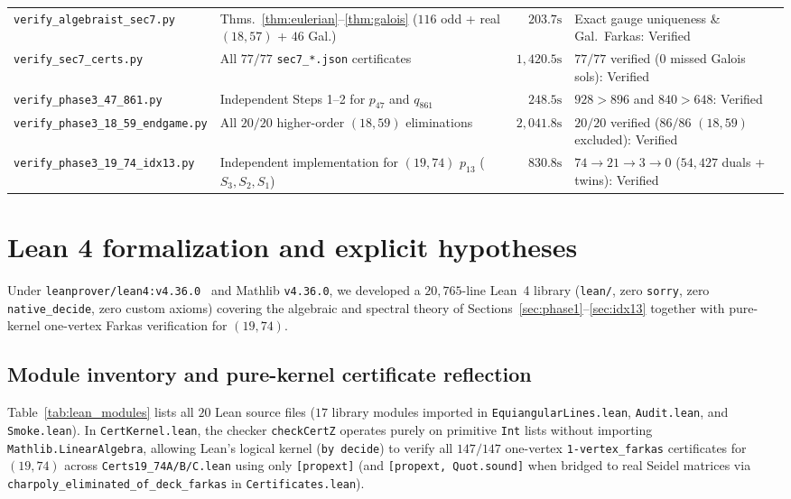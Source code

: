 \documentclass[11pt,reqno]{amsart}
\theoremstyle{definition}
\theoremstyle{remark}
\numberwithin{equation}{section}
\numberwithin{table}{section}
\begin{document}
\begin{table}[htbp]
{\begin{tabular}{@{}llrl@{}}
\nolinkurl{verify_algebraist_sec7.py} & Thms.~\ref{thm:eulerian}--\ref{thm:galois} ($116$ odd + real $(18,57)$ + $46$ Gal.) & $203.7\text{s}$ & Exact gauge uniqueness \& Gal.\ Farkas: Verified \\
\nolinkurl{verify_sec7_certs.py} & All $77/77$ \nolinkurl{sec7_*.json} certificates & $1{,}420.5\text{s}$ & $77/77$ verified ($0$ missed Galois sols): Verified \\
\nolinkurl{verify_phase3_47_861.py} & Independent Steps 1--2 for $p_{47}$ and $q_{861}$ & $248.5\text{s}$ & $928 > 896$ and $840 > 648$: Verified \\
\nolinkurl{verify_phase3_18_59_endgame.py} & All $20/20$ higher-order $(18, 59)$ eliminations & $2{,}041.8\text{s}$ & $20/20$ verified ($86/86$ $(18,59)$ excluded): Verified \\
\nolinkurl{verify_phase3_19_74_idx13.py} & Independent implementation for $(19, 74)$ $p_{13}$ ($S_3,S_2,S_1$) & $830.8\text{s}$ & $74\to 21\to 3\to 0$ ($54{,}427$ duals + twins): Verified \\
\bottomrule
\end{tabular}%
}
\end{table}

\section{Lean 4 formalization and explicit hypotheses}\label{sec:lean}

Under \nolinkurl{leanprover/lean4:v4.36.0}~\cite{MouraUllrich2021} and Mathlib \texttt{v4.36.0}, we developed a $20{,}765$-line Lean~4 library (\nolinkurl{lean/}, zero \texttt{sorry}, zero \nolinkurl{native_decide}, zero custom axioms) covering the algebraic and spectral theory of Sections~\ref{sec:phase1}--\ref{sec:idx13} together with pure-kernel one-vertex Farkas verification for $(19, 74)$.

\subsection{Module inventory and pure-kernel certificate reflection}
Table~\ref{tab:lean_modules} lists all $20$ Lean source files ($17$ library modules imported in \nolinkurl{EquiangularLines.lean}, \nolinkurl{Audit.lean}, and \nolinkurl{Smoke.lean}). In \nolinkurl{CertKernel.lean}, the checker \nolinkurl{checkCertZ} operates purely on primitive \texttt{Int} lists without importing \texttt{Mathlib.LinearAlgebra}, allowing Lean's logical kernel (\texttt{by decide}) to verify all $147/147$ one-vertex \texttt{1-vertex\_farkas} certificates for $(19, 74)$ across \nolinkurl{Certs19_74A/B/C.lean} using only \texttt{[propext]} (and \texttt{[propext, Quot.sound]} when bridged to real Seidel matrices via \nolinkurl{charpoly_eliminated_of_deck_farkas} in \nolinkurl{Certificates.lean}).
\end{document}
